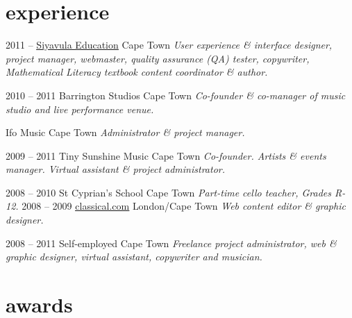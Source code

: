 \documentclass[]{friggeri-cv} %
\begin{document}
\section{experience}

\begin{entrylist}
\entry
{2011 --}
{\href{http://www.siyavula.com}{\underline{Siyavula Education}}}
{Cape Town}
{\emph{User experience \& interface designer, project manager, webmaster, quality assurance (QA) tester, copywriter, Mathematical Literacy textbook content coordinator \& author.}}

\entry
{2010 -- 2011}
{Barrington Studios}
{Cape Town}
{\emph{Co-founder \& co-manager of music studio and live performance venue.}}



\entry
{}
{Ifo Music}
{Cape Town}
{\emph{Administrator \& project manager.}}

\entry
{2009 -- 2011}
{Tiny Sunshine Music}
{Cape Town}
{\emph{Co-founder. Artists \& events manager. Virtual assistant \& project administrator.}}


\entry
{2008 -- 2010}
{St Cyprian's School}
{Cape Town}
{\emph{Part-time cello teacher, Grades R-12.}}
\entry
{2008 -- 2009}
{\href{http://www.classical.com}{\underline{classical.com}}}
{London/Cape Town}
{\emph{Web content editor \& graphic designer.}}


\entry
{2008 -- 2011}
{Self-employed}
{Cape Town}
{\emph{Freelance project administrator, web \& graphic designer, virtual assistant, copywriter and musician.}}

\end{entrylist}


\section{awards}
\end{document}
